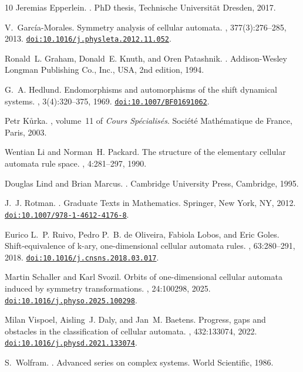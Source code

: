 \documentclass[11pt,a4paper]{article}
\newenvironment{revision}{\color{blue}}{}
\newenvironment{revision}{\color{black}}{}
\newcommand{\doi}[1]{\href{https://doi.org/#1}{\nolinkurl{doi:#1}}}
\begin{document}
\begin{revision}
\begin{thebibliography}{10}
Jeremias Epperlein.
.
\newblock PhD thesis, Technische Universit{\"a}t Dresden, 2017.

V.~García-Morales.
\newblock Symmetry analysis of cellular automata.
, 377(3):276--285, 2013.
\newblock \doi{10.1016/j.physleta.2012.11.052}.

Ronald~L. Graham, Donald~E. Knuth, and Oren Patashnik.
.
\newblock Addison-Wesley Longman Publishing Co., Inc., USA, 2nd edition, 1994.

G.~A. Hedlund.
\newblock Endomorphisms and automorphisms of the shift dynamical systems.
, 3(4):320--375, 1969.
\newblock \doi{10.1007/BF01691062}.

Petr K{\r u}rka.
, volume~11 of {\em Cours
  Sp{\'e}cialis{\'e}s}.
\newblock Soci{\'e}t{\'e} Math{\'e}matique de France, Paris, 2003.

Wentian Li and Norman~H. Packard.
\newblock The structure of the elementary cellular automata rule space.
, 4:281--297, 1990.

Douglas Lind and Brian Marcus.
.
\newblock Cambridge University Press, Cambridge, 1995.

J.~J. Rotman.
.
\newblock Graduate Texts in Mathematics. Springer, New York, NY, 2012.
\newblock \doi{10.1007/978-1-4612-4176-8}.

Eurico L.~P. Ruivo, Pedro P.~B. {de Oliveira}, Fabiola Lobos, and Eric Goles.
\newblock Shift-equivalence of k-ary, one-dimensional cellular automata rules.
,
  63:280--291, 2018.
\newblock \doi{10.1016/j.cnsns.2018.03.017}.

Martin Schaller and Karl Svozil.
\newblock Orbits of one-dimensional cellular automata induced by symmetry
  transformations.
, 24:100298, 2025.
\newblock \doi{10.1016/j.physo.2025.100298}.

Milan Vispoel, Aisling~J. Daly, and Jan~M. Baetens.
\newblock Progress, gaps and obstacles in the classification of cellular
  automata.
, 432:133074, 2022.
\newblock \doi{10.1016/j.physd.2021.133074}.

S.~Wolfram.
.
\newblock Advanced series on complex systems. World Scientific, 1986.

\end{thebibliography}
\end{revision}
\end{document}
